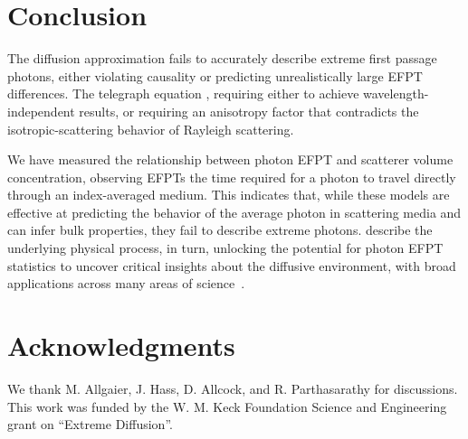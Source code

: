 \section{Conclusion}

The diffusion approximation fails to accurately describe extreme first passage photons, either violating causality or predicting unrealistically large EFPT differences. The telegraph equation , requiring either  to achieve wavelength-independent results, or requiring an anisotropy factor  that contradicts the isotropic-scattering behavior of Rayleigh scattering.

We have measured the relationship between photon EFPT and scatterer volume concentration, observing EFPTs  the time required for a photon to travel directly through an index-averaged medium. This indicates that, while these models are effective at predicting the behavior of the average photon in scattering media and can infer bulk properties, they fail to describe extreme photons.  describe the underlying physical process, in turn, unlocking the potential for photon EFPT statistics to uncover critical insights about the diffusive environment, with broad applications across many areas of science~\cite{redner_8_2001,weiss_applications_2002,godec_first_2016,noskowicz_average_1988,grebenkov_molecular_2021,polizzi_mean_2016,barney_first-passage-time_2017,zsurkis_first_2024,lawley_distribution_2020,lawley_slowest_2023,lawley_universal_2020,schuss_redundancy_2019,meerson_mortality_2015,chun_heterogeneous_2023}.



\section{Acknowledgments}
We thank M. Allgaier, J. Hass, D. Allcock, and R. Parthasarathy for discussions. This work was funded by the W. M. Keck Foundation Science and Engineering grant on ``Extreme Diffusion''.

